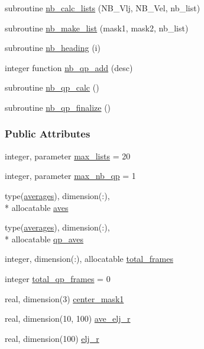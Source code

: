 \begin{DoxyCompactItemize}
\item 
subroutine \hyperlink{classcalc__nb_a600889d4c85c927366dcdf744c4299e9}{nb\-\_\-calc\-\_\-lists} (N\-B\-\_\-\-Vlj, N\-B\-\_\-\-Vel, nb\-\_\-list)
\item 
subroutine \hyperlink{classcalc__nb_a89a57b491ed84c3a4ddc05a0c379613d}{nb\-\_\-make\-\_\-list} (mask1, mask2, nb\-\_\-list)
\item 
subroutine \hyperlink{classcalc__nb_aa0c90f5c7303a22f778585374acc4a5f}{nb\-\_\-heading} (i)
\item 
integer function \hyperlink{classcalc__nb_a6d26079e3680e2780d8c7f302b538596}{nb\-\_\-qp\-\_\-add} (desc)
\item 
subroutine \hyperlink{classcalc__nb_a936e04ca43919cd2cacfd48dbfac7d52}{nb\-\_\-qp\-\_\-calc} ()
\item 
subroutine \hyperlink{classcalc__nb_ac6032c768a8f42bc47e597e359478356}{nb\-\_\-qp\-\_\-finalize} ()
\end{DoxyCompactItemize}
\subsubsection*{Public Attributes}
\begin{DoxyCompactItemize}
\item 
integer, parameter \hyperlink{classcalc__nb_a7608a4a45c4aa5ef92f94d77f1f5e48a}{max\-\_\-lists} = 20
\item 
integer, parameter \hyperlink{classcalc__nb_a7c528e28ccdf3d8e12a25c6e41456704}{max\-\_\-nb\-\_\-qp} = 1
\item 
type(\hyperlink{structcalc__nb_1_1averages}{averages}), dimension(\-:), \\*
allocatable \hyperlink{classcalc__nb_a7c88dc0e90934920f9ea37a05ba4c394}{aves}
\item 
type(\hyperlink{structcalc__nb_1_1averages}{averages}), dimension(\-:), \\*
allocatable \hyperlink{classcalc__nb_a8f4b9b4a7f6179d3b4284f88af41c5ae}{qp\-\_\-aves}
\item 
integer, dimension(\-:), allocatable \hyperlink{classcalc__nb_a6a6b018f0e4740dd22802db5b67c5d4a}{total\-\_\-frames}
\item 
integer \hyperlink{classcalc__nb_a3eecb536afb1b6d651d1f853fc767a40}{total\-\_\-qp\-\_\-frames} = 0
\item 
real, dimension(3) \hyperlink{classcalc__nb_abe9b066386968d07626e3187008e5b95}{center\-\_\-mask1}
\item 
real, dimension(10, 100) \hyperlink{classcalc__nb_aebba0b48c6600b0defb99f924c13adcd}{ave\-\_\-elj\-\_\-r}
\item 
real, dimension(100) \hyperlink{classcalc__nb_a7b2f5b555609710957cf5a10976a4033}{elj\-\_\-r}
\end{DoxyCompactItemize}
